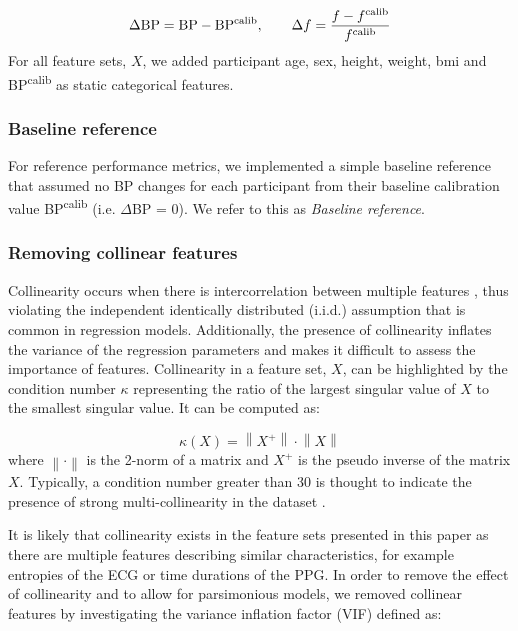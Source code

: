 \documentclass[fleqn,10pt]{wlscirep}
\begin{document}
\begin{equation*}
    \Delta\text{BP} = \text{BP}  - \text{BP\textsuperscript{calib}}, \qquad \Delta f = \frac{f  - f\textsuperscript{calib}}{f\textsuperscript{calib}}
\end{equation*}
For all feature sets, $X$, we added participant age, sex, height, weight, \ac{bmi} and BP\textsuperscript{calib} as static categorical features. 

\subsubsection{Baseline reference}

For reference performance metrics, we implemented a simple baseline reference that assumed no BP changes for each participant from their baseline calibration value BP\textsuperscript{calib} (i.e. $\Delta$BP = 0). We refer to this as \textit{Baseline reference}.

\subsubsection{Removing collinear features}


Collinearity occurs when there is intercorrelation between multiple features \cite{Dormann2013, Kim2019}, thus violating the independent identically distributed (i.i.d.) assumption that is common in regression models. Additionally, the presence of collinearity inflates the variance of the regression parameters and makes it difficult to assess the importance of features. Collinearity in a feature set, $X$, can be highlighted by the condition number $\kappa$ representing the ratio of the largest singular value of $X$ to the smallest singular value. It can be computed as:

\begin{equation}
\kappa(X) = \left\|X^{+}\right\| \cdot \left\|X\right\|
\end{equation}
where $\left\|\cdot\right\|$ is the 2-norm of a matrix and $X^{+}$ is the pseudo inverse of the matrix $X$. Typically, a condition number greater than 30 is thought to indicate the presence of strong multi-collinearity in the dataset \cite{Kim2019}.

It is likely that collinearity exists in the feature sets presented in this paper as there are multiple features describing similar characteristics, for example entropies of the ECG or time durations of the PPG. In order to remove the effect of collinearity and to allow for parsimonious models, we removed collinear features by investigating the variance inflation factor (VIF) defined as:
\end{document}
